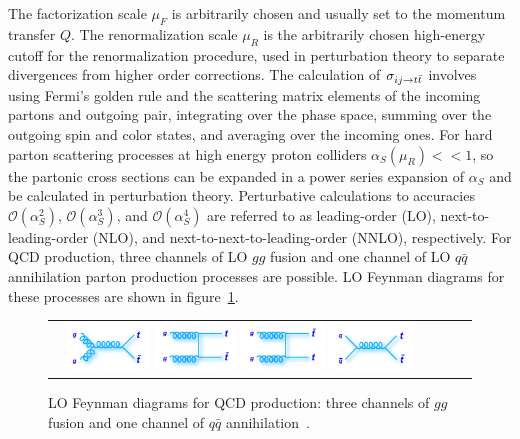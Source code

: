 The factorization scale $\mu_F$ is arbitrarily chosen and usually set to the momentum transfer $Q$.
The renormalization scale $\mu_R$ is the arbitrarily chosen high-energy cutoff for the renormalization procedure, used in perturbation theory to separate divergences from higher order corrections.
The calculation of $\sigma_{i j \rightarrow t\bar{t}}$ involves using Fermi's golden rule and the scattering matrix elements of the incoming partons and outgoing \ttbar pair, integrating over the phase space, summing over the outgoing spin and color states, and averaging over the incoming ones.
For hard parton scattering processes at high energy proton colliders $\alpha_S(\mu_R) << 1$, so the partonic cross sections can be expanded in a power series expansion of $\alpha_S$ and be calculated in perturbation theory. 
Perturbative calculations to accuracies $\mathcal{O}(\alpha^2_S)$, $\mathcal{O}(\alpha^3_S)$, and $\mathcal{O}(\alpha^4_S)$ are referred to as leading-order (LO), next-to-leading-order (NLO), and next-to-next-to-leading-order (NNLO), respectively.
For QCD \ttbar production, three channels of LO $gg$ fusion and one channel of LO $q\bar{q}$ annihilation parton production processes are possible.
LO Feynman diagrams for these processes are shown in figure~\ref{ttbar_production_LO_feynman_diagrams}.
\begin{figure}[!h]
  \begin{center}
    \begin{tabular}{cccc}
        \includegraphics[width=0.225\textwidth]{fig_TopQuark/feynman_ttbar_LHC_gggtt.png}
        \includegraphics[width=0.225\textwidth]{fig_TopQuark/feynman_ttbar_LHC_ggttt.png}
        \includegraphics[width=0.225\textwidth]{fig_TopQuark/feynman_ttbar_LHC_ggttbart.png}
        \includegraphics[width=0.225\textwidth]{fig_TopQuark/feynman_ttbar_LHC_qqgtt.png}
    \end{tabular}
    \caption{LO Feynman diagrams for QCD \ttbar production: three channels of $gg$ fusion and one channel of $q\bar{q}$ annihilation~\cite{d0_diagrams}.
            }
    \label{ttbar_production_LO_feynman_diagrams}
  \end{center}
\end{figure}
